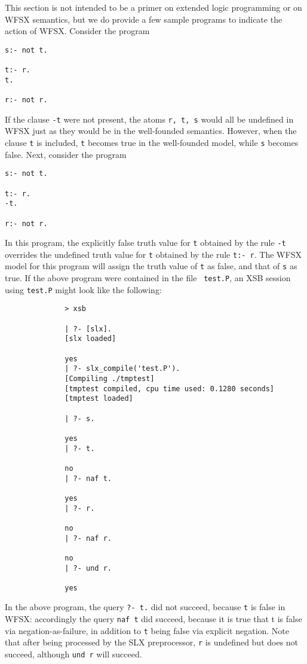 This section is not intended to be a primer on extended logic
programming or on WFSX semantics, but we do provide a few sample
programs to indicate the action of WFSX.  Consider the program
{\small 
\begin{verbatim}
s:- not t.

t:- r.
t.

r:- not r.
\end{verbatim}
}
If the clause {\tt -t} were not present, the atoms {\tt r, t, s} would
all be undefined in WFSX just as they would be in the well-founded
semantics.  However, when the clause {\tt t} is included, {\tt t}
becomes true in the well-founded model, while {\tt s} becomes false.
Next, consider the program
{\small 
\begin{verbatim}
s:- not t.

t:- r.
-t.

r:- not r.
\end{verbatim}
}
In this program, the explicitly false truth value for {\tt t} obtained
by the rule {\tt -t} overrides the undefined truth value for {\tt t}
obtained by the rule {\tt t:- r}.  The WFSX model for this program
will assign the truth value of {\tt t} as false, and that of {\tt s}
as true.  If the above program were contained in the file {\tt
test.P}, an XSB session using {\tt test.P} might look like the
following:
{\small
\begin{verbatim}
              > xsb
              
              | ?- [slx].
              [slx loaded]
            
              yes
              | ?- slx_compile('test.P').
              [Compiling ./tmptest]
              [tmptest compiled, cpu time used: 0.1280 seconds]
              [tmptest loaded]
            
              | ?- s.
              
              yes
              | ?- t.

              no
              | ?- naf t.
              
              yes
              | ?- r.

              no
              | ?- naf r.
              
              no
              | ?- und r.
              
              yes
\end{verbatim}
}
In the above program, the query {\tt ?- t.} did not succeed,  because
{\tt t} is false in WFSX: accordingly the query {\tt naf t} did
succeed, because it is true that t is false via negation-as-failure,
in addition to {\tt t} being false via explicit negation.  Note that
after being processed by the SLX preprocessor, {\tt r} is undefined
but does not succeed, although {\tt und r} will succeed.

